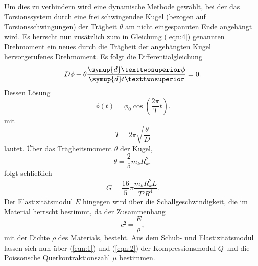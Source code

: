 Um dies zu verhindern wird eine dynamische Methode gewählt, bei der das Torsionssystem durch eine frei schwingendee Kugel (bezogen auf Torsionsschwingungen) der Trägheit $\theta$ am nicht eingespannten Ende angehängt wird.
Es herrscht nun zusätzlich zum in Gleichung (\ref{eqn:4}) genannten Drehmoment ein neues durch die Trägheit der angehängten Kugel hervorgerufenes Drehmoment.
Es folgt die Differentialgleichung
\begin{equation}
  D \phi + \theta \frac{\symup{d}²\phi}{\symup{d}t²} = 0.
\end{equation}
Dessen Lösung
\begin{equation}
  \phi (t) = \phi_0\cos\left(\frac{2\pi}{T}t\right). \label{eqn:5}
\end{equation}
mit
\begin{equation}
  T = 2\pi\sqrt{\frac{\theta}{D}} \label{eqn:6}
\end{equation}
lautet.
Über das Trägheitsmoment $\theta$ der Kugel,
\begin{equation}
  \theta = \frac{2}{5}m_k R_k^2, \label{eqn:6}
\end{equation}
folgt schließlich
\begin{equation}
  G = \frac{16}{5}\pi\frac{m_k R_k^2 L}{T²R^4}. \label{eqn:7}
\end{equation}
Der Elastizitätsmodul $E$ hingegen wird über die Schallgeschwindigkeit, die im Material herrscht bestimmt, da der Zusammenhang
\begin{equation}
  c² = \frac{E}{\rho},
\end{equation}
mit der Dichte $\rho$ des Materials, besteht.
Aus dem Schub- und Elastizitätsmodul lassen sich nun über (\ref{eqn:1}) und (\ref{eqn:2}) der Kompressionsmodul $Q$ und die Poissonsche Querkontraktionszahl $\mu$ bestimmen.
